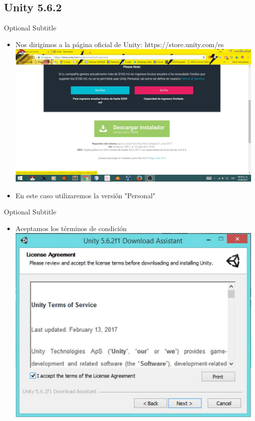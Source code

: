 \documentclass{beamer}
\begin{document}
\subsection{Unity 5.6.2}

\begin{frame}{01}{Optional Subtitle}
  \begin{itemize}
  \item {
    Nos dirigimos a la página oficial de Unity:
    https://store.unity.com/es
  }
  \includegraphics[width=\linewidth]{image/IU01}
  \item {
    En este caso utilizaremos la versión "Personal"
  }
  \end{itemize}
\end{frame}

\begin{frame}{02}{Optional Subtitle}
  \begin{itemize}
  \item {
    Aceptamos los términos de condición
  }
  \includegraphics[width=\linewidth]{image/IU02}
  \end{itemize}
\end{frame}
\end{document}
